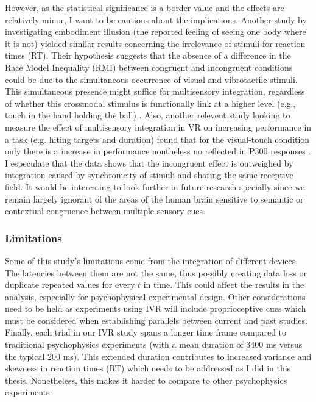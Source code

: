 \documentclass[12pt,oneside,openright]{report}
\begin{document}
However, as the statistical significance is a border value and the effects are relatively minor, I want to be cautious about the implications. Another study by \cite{RSE_FBI} investigating embodiment illusion (the reported feeling of seeing one body where it is not) yielded similar results concerning the irrelevance of stimuli for reaction times (RT). Their hypothesis suggests that the absence of a difference in the Race Model Inequality (RMI) between congruent and incongruent conditions could be due to the simultaneous occurrence of visual and vibrotactile stimuli. This simultaneous presence might suffice for multisensory integration, regardless of whether this crossmodal stimulus is functionally link at a higher level (e.g., touch in the hand holding the ball) \parencite{RSE_FBI}. Also, another relevent study looking to measure the effect of multisensory integration in VR on increasing performance in a task (e.g. hiting targets and duration) found that for the visual-touch condition only there is a increase in performance nontheless no reflected in P300 responses \parencite{Marucci2021TheIO}.  
I especulate that the data shows that the incongruent effect is outweighed by integration caused by synchronicity of stimuli and sharing the same receptive field. It would be interesting to look further in future research specially since we
remain largely ignorant of the areas of the human brain sensitive to semantic or contextual congruence between multiple sensory cues. 

\subsubsection*{Limitations}

Some of this study's limitations come from the integration of different devices. The latencies between them are not the same, thus possibly creating data loss or duplicate repeated values for every $t$ in time. This could affect the results in the analysis, especially for psychophysical experimental design. Other considerations need to be held as experiments using IVR will include proprioceptive cues which must be considered when establishing parallels between current and past studies. Finally, each trial in our IVR study spans a longer time frame compared to traditional psychophysics experiments (with a mean duration of 3400 ms versus the typical 200 ms). This extended duration contributes to increased variance and skewness in reaction times (RT) which needs to be addressed as I did in this thesis. Nonetheless, this makes it harder to compare to other psychophysics experiments. 
\end{document}
